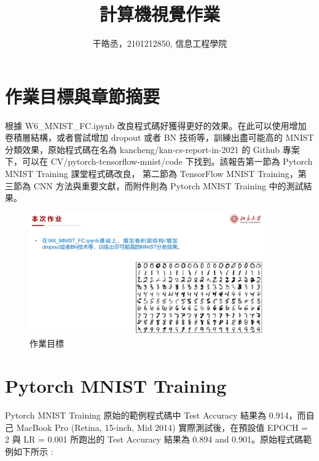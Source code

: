 \documentclass[11pt,UTF8]{ctexart}
\title{計算機視覺作業}
\author{干皓丞，2101212850, 信息工程學院}
\begin{document}
\maketitle


\section{作業目標與章節摘要}

根據 W6\_MNIST\_FC.ipynb 改良程式碼好獲得更好的效果。在此可以使用增加卷積層結構，或者嘗試增加 dropout 或者 BN 技術等，訓練出盡可能高的 MNIST 分類效果，原始程式碼在名為 kancheng/kan-cs-report-in-2021 的 Github 專案下，可以在 CV/pytorch-tensorflow-mnist/code 下找到。該報告第一節為 Pytorch MNIST Training 課堂程式碼改良， 第二節為 TensorFlow MNIST Training，第三節為 CNN 方法與重要文獻，而附件則為 Pytorch MNIST Training 中的測試結果。

\begin{figure}[H]
\centering 
\includegraphics[width=0.9\textwidth]{t1.png} 
\caption{作業目標}
\label{Test}
\end{figure}

\newpage

\section{Pytorch MNIST Training}

Pytorch MNIST Training 原始的範例程式碼中 Test Accuracy 結果為 0.914，而自己 MacBook Pro (Retina, 15-inch, Mid 2014) 實際測試後，在預設值 EPOCH = 2 與 LR = 0.001 所跑出的  Test Accuracy 結果為 0.894 and 0.901。原始程式碼範例如下所示 :
\end{document}
